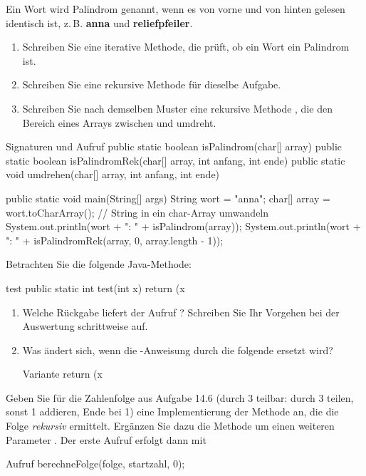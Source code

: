 Ein Wort wird Palindrom genannt, wenn es von vorne und von hinten gelesen identisch ist, z.\,B. \textbf{anna} und \textbf{reliefpfeiler}.
\begin{enumerate}[label=\alph*)]
\item Schreiben Sie eine iterative Methode, die prüft, ob ein Wort ein Palindrom ist.
\item Schreiben Sie eine rekursive Methode für dieselbe Aufgabe.
\item Schreiben Sie nach demselben Muster eine rekursive Methode , die den Bereich eines Arrays zwischen  und  umdreht.
\end{enumerate}
\begin{javacode}[Ausschnitt]{Signaturen und Aufruf}
public static boolean isPalindrom(char[] array)
public static boolean isPalindromRek(char[] array, int anfang, int ende)
public static void umdrehen(char[] array, int anfang, int ende)

public static void main(String[] args) {
	String wort = "anna";
	char[] array = wort.toCharArray();       // String in ein char-Array umwandeln
	System.out.println(wort + ": " + isPalindrom(array));
	System.out.println(wort + ": " + isPalindromRek(array, 0, array.length - 1));
}
\end{javacode}

Betrachten Sie die folgende Java-Methode:
\begin{javacode}[Ausschnitt]{test}
public static int test(int x) {
	return (x %
}
\end{javacode}
\begin{enumerate}[label=\alph*)]
\item Welche Rückgabe liefert der Aufruf ? Schreiben Sie Ihr Vorgehen bei der Auswertung schrittweise auf.
\item Was ändert sich, wenn die -Anweisung durch die folgende ersetzt wird?
\begin{javacode}[Ausschnitt]{Variante}
	return (x %
\end{javacode}
\end{enumerate}

\label{auf:folgerek}
Geben Sie für die Zahlenfolge aus Aufgabe 14.6 (durch 3 teilbar: durch 3 teilen, sonst 1 addieren, Ende bei 1) eine Implementierung der Methode  an, die die Folge \emph{rekursiv} ermittelt. Ergänzen Sie dazu die Methode um einen weiteren Parameter . Der erste Aufruf erfolgt dann mit
\begin{javacode}[Ausschnitt]{Aufruf}
berechneFolge(folge, startzahl, 0);
\end{javacode}

